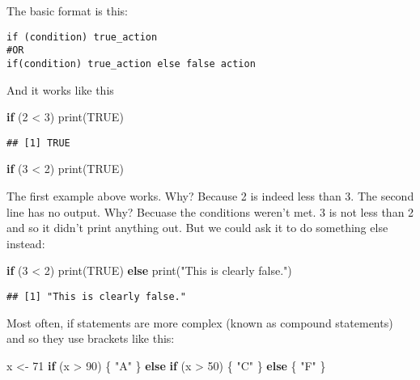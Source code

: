 \documentclass[
]{article}
\newenvironment{Shaded}{\begin{snugshade}}{\end{snugshade}}
\newcommand{\ConstantTok}[1]{\textcolor[rgb]{0.00,0.00,0.00}{#1}}
\newcommand{\ControlFlowTok}[1]{\textcolor[rgb]{0.13,0.29,0.53}{\textbf{#1}}}
\newcommand{\DecValTok}[1]{\textcolor[rgb]{0.00,0.00,0.81}{#1}}
\newcommand{\FunctionTok}[1]{\textcolor[rgb]{0.00,0.00,0.00}{#1}}
\newcommand{\NormalTok}[1]{#1}
\newcommand{\OtherTok}[1]{\textcolor[rgb]{0.56,0.35,0.01}{#1}}
\newcommand{\SpecialCharTok}[1]{\textcolor[rgb]{0.00,0.00,0.00}{#1}}
\newcommand{\StringTok}[1]{\textcolor[rgb]{0.31,0.60,0.02}{#1}}
\begin{document}
The basic format is this:

\begin{verbatim}
if (condition) true_action 
#OR
if(condition) true_action else false action 
\end{verbatim}

And it works like this

\begin{Shaded}
\begin{Highlighting}[]
\ControlFlowTok{if}\NormalTok{ (}\DecValTok{2} \SpecialCharTok{\textless{}} \DecValTok{3}\NormalTok{) }\FunctionTok{print}\NormalTok{(}\ConstantTok{TRUE}\NormalTok{)}
\end{Highlighting}
\end{Shaded}

\begin{verbatim}
## [1] TRUE
\end{verbatim}

\begin{Shaded}
\begin{Highlighting}[]
\ControlFlowTok{if}\NormalTok{ (}\DecValTok{3} \SpecialCharTok{\textless{}} \DecValTok{2}\NormalTok{) }\FunctionTok{print}\NormalTok{(}\ConstantTok{TRUE}\NormalTok{)}
\end{Highlighting}
\end{Shaded}

The first example above works. Why? Because 2 is indeed less than 3. The
second line has no output. Why? Becuase the conditions weren't met. 3 is
not less than 2 and so it didn't print anything out. But we could ask it
to do something else instead:

\begin{Shaded}
\begin{Highlighting}[]
\ControlFlowTok{if}\NormalTok{ (}\DecValTok{3} \SpecialCharTok{\textless{}} \DecValTok{2}\NormalTok{) }\FunctionTok{print}\NormalTok{(}\ConstantTok{TRUE}\NormalTok{) }\ControlFlowTok{else} \FunctionTok{print}\NormalTok{(}\StringTok{"This is clearly false."}\NormalTok{)}
\end{Highlighting}
\end{Shaded}

\begin{verbatim}
## [1] "This is clearly false."
\end{verbatim}

Most often, if statements are more complex (known as compound
statements) and so they use brackets like this:

\begin{Shaded}
\begin{Highlighting}[]
\NormalTok{x }\OtherTok{\textless{}{-}} \DecValTok{71}
\ControlFlowTok{if}\NormalTok{ (x }\SpecialCharTok{\textgreater{}} \DecValTok{90}\NormalTok{) \{}
  \StringTok{"A"}
\NormalTok{\} }\ControlFlowTok{else} \ControlFlowTok{if}\NormalTok{ (x }\SpecialCharTok{\textgreater{}} \DecValTok{50}\NormalTok{) \{}
  \StringTok{"C"}
\NormalTok{\} }\ControlFlowTok{else}\NormalTok{ \{}
  \StringTok{"F"}
\NormalTok{  \}}
\end{Highlighting}
\end{Shaded}
\end{document}
